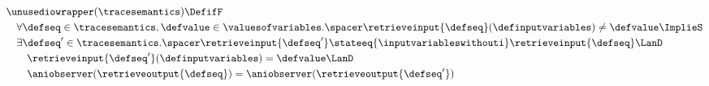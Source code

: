 \begin{align*}
  &\unusediowrapper(\tracesemantics) \DefifF \\
  &\quad\forall
    \defseq\in\tracesemantics, \defvalue\in\valuesofvariables
  .\spacer
    \retrieveinput{\defseq}(\definputvariables) \neq \defvalue \ImplieS \\
    &\quad\exists
      \defseq'\in\tracesemantics
    .\spacer
      \retrieveinput{\defseq'} \stateeq{\inputvariableswithouti} \retrieveinput{\defseq}
      \LanD \\
    &\quad\quad
      \retrieveinput{\defseq'}(\definputvariables) = \defvalue
      \LanD \\
    &\quad\quad
      \aniobserver(\retrieveoutput{\defseq}) = \aniobserver(\retrieveoutput{\defseq'})
\end{align*}
